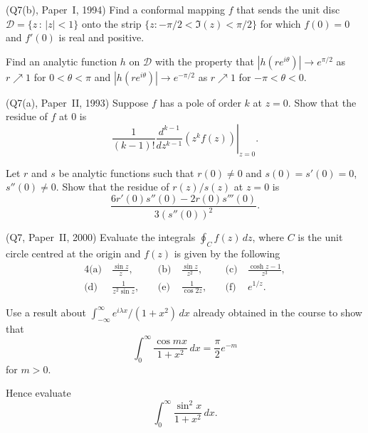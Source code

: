 \begin{question} (Q7(b), Paper~I, 1994) Find a conformal
mapping $f$ that sends the unit disc ${\mathcal D}=\{z\,:\,|z|<1\}$
onto the strip $\{z:-\pi/2<\Im(z)<\pi/2\}$ for which
$f(0)=0$ and $f'(0)$ is real and positive.


Find an analytic function $h$ on ${\mathcal D}$ with the
property
that $|h(re^{i\theta})|\rightarrow e^{\pi/2}$
as $r\nearrow 1$ for $0<\theta<\pi$ and
$|h(re^{i\theta})|\rightarrow e^{-\pi/2}$
as $r\nearrow 1$ for $-\pi<\theta<0$.
\end{question}
\begin{question} (Q7(a), Paper~II, 1993) Suppose $f$ has a pole
of order $k$ at $z=0$. Show that the residue of $f$ at $0$
is
\[\left.\frac{1}{(k-1)!}\frac{d^{k-1}}{dz^{k-1}}(z^{k}f(z))
\right|_{z=0}.\]

Let $r$ and $s$ be analytic functions such that $r(0)\neq 0$
and $s(0)=s'(0)=0$, $s''(0)\neq 0$. Show that
the residue of $r(z)/s(z)$ at $z=0$ is
\[\frac{6r'(0)s''(0)-2r(0)s'''(0)}{3(s''(0))^{2}}.\]

\end{question}
\begin{question} (Q7, Paper~II, 2000) Evaluate the integrals
$\oint_{C}f(z)\,dz$, where $C$ is the unit circle centred at the 
origin and $f(z)$ is given by the following
\begin{alignat*}{4}
\text{(a)}&\ \frac{\sin z}{z},&\ &\text{(b)}&\ \frac{\sin z}{z^{2}},
&\ &\text{(c)}&\ \frac{\cosh z-1}{z^{3}},\\
\text{(d)}&\ \frac{1}{z^{2}\sin z},&\ &\text{(e)}&\ \frac{1}{\cos 2z},
&\ &\text{(f)}&\ e^{1/z}.
\end{alignat*}
\end{question}
\begin{question} Use a result about
$\int_{-\infty}^{\infty}e^{i\lambda x}/(1+x^{2})\,dx$
already obtained in the course to show that
\[\int_{0}^{\infty}\frac{\cos mx}{1+x^{2}}\,dx
=\frac{\pi}{2}e^{-m}\]
for $m>0$. 

Hence evaluate
\[\int_{0}^{\infty}\frac{\sin^{2}x}{1+x^{2}}\,dx.\]
\end{question}
